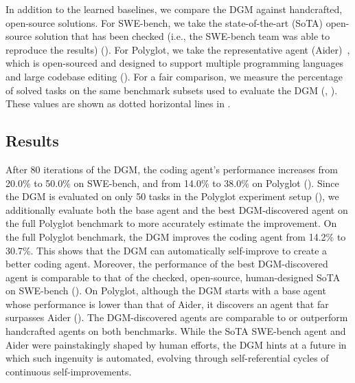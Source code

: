 In addition to the learned baselines, we compare the DGM against handcrafted, open-source solutions. For SWE-bench, we take the state-of-the-art (SoTA) open-source solution that has been checked (i.e., the SWE-bench team was able to reproduce the results) (). For Polyglot, we take the representative agent (Aider)~\citep{aider2024}, which is open-sourced and designed to support multiple programming languages and large codebase editing (). For a fair comparison, we measure the percentage of solved tasks on the same benchmark subsets used to evaluate the DGM (, ). These values are shown as dotted horizontal lines in .

\subsection{Results}
\label{sec:results}









After 80 iterations of the DGM, the coding agent's performance increases from 20.0\% to 50.0\% on SWE-bench, and from 14.0\% to 38.0\% on Polyglot (). Since the DGM is evaluated on only 50 tasks in the Polyglot experiment setup (), we additionally evaluate both the base agent and the best DGM-discovered agent on the full Polyglot benchmark to more accurately estimate the improvement. On the full Polyglot benchmark, the DGM improves the coding agent from 14.2\% to 30.7\%. This shows that the DGM can automatically self-improve to create a better coding agent. Moreover, the performance of the best DGM-discovered agent is comparable to that of the checked, open-source, human-designed SoTA on SWE-bench (). On Polyglot, although the DGM starts with a base agent whose performance is lower than that of Aider, it discovers an agent that far surpasses Aider (). The DGM-discovered agents are comparable to or outperform handcrafted agents on both benchmarks. While the SoTA SWE-bench agent and Aider were painstakingly shaped by human efforts, the DGM hints at a future in which such ingenuity is automated, evolving through self-referential cycles of continuous self-improvements.

